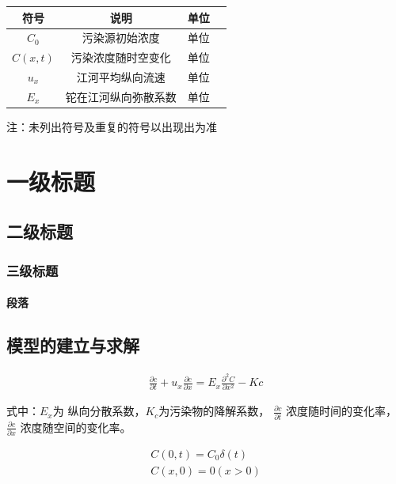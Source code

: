 \documentclass{whutmod}
\begin{document}
	\begin{table}[H]
	\label{biao} \centering
		\begin{tabular}{cccc}
			\toprule[1.5pt]
			\multicolumn{1}{m{4cm}}{\centering 符号} & \multicolumn{1}{m{4cm}}{\centering 说明} & \multicolumn{1}{m{4cm}}{\centering 单位}\\
			\midrule[1pt]
			$C_{0}$	 &  污染源初始浓度 & 单位\\ 
			$C(x,t)$ &  污染浓度随时空变化 & 单位\\ 
			$u_{x}$	 &  江河平均纵向流速 & 单位\\ 
			$E_{x}$  &  铊在江河纵向弥散系数& 单位\\ 
			\bottomrule[1.5pt]
		\end{tabular}
	\end{table}
	注：未列出符号及重复的符号以出现出为准

	
	\section{一级标题}
	\subsection{二级标题}
	\subsubsection{三级标题}
	\paragraph{段落}

	\subsection{模型的建立与求解}

	\begin{gather}
		\frac{\partial c}{\partial t}+u_{x}\frac{\partial c}{\partial x}=E_{x}\frac{\partial^{2} C}{\partial x^{2}}-Kc
	\end{gather}

	式中：$E_{x}$为 纵向分散系数，$K_{c}$为污染物的降解系数，
	$\frac{\partial c}{\partial t}$ 浓度随时间的变化率，$\frac{\partial c}{\partial x}$ 浓度随空间的变化率。
	
	\begin{gather*}
	C(0,t)=C_{0}\delta (t)\\
	 C(x,0)=0(x>0)
	\end{gather*}
\end{document}

